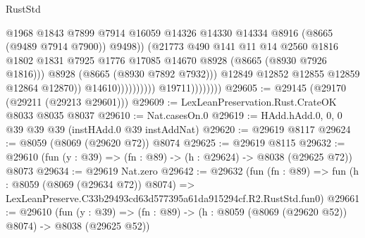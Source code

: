 \begin{lexlean}{RustStd}
\begin{coremodule}
                                                  @1968
                                                  @1843
                                                  @7899
                                                  @7914
                                                  @16059
                                                  @14326
                                                  @14330
                                                  @14334
                                                  @8916
                                                  (@8665 (@9489 @7914 @7900))
                                                  @9498))
                                              (@21773
                                                @490
                                                @141
                                                @11
                                                @14
                                                @2560
                                                @1816
                                                @1802
                                                @1831
                                                @7925
                                                @1776
                                                @17085
                                                @14670
                                                @8928
                                                (@8665 (@8930 @7926 @1816)))
                                              @8928
                                              (@8665 (@8930 @7892 @7932)))
                                            @12849
                                            @12852
                                            @12855
                                            @12859
                                            @12864
                                            @12870))
                                        @14610))))))))))
                    @19711))))))))
@29605 := @29145 (@29170 (@29211 (@29213 @29601)))
@29609 := LexLeanPreservation.Rust.CrateOK @8033 @8035 @8037
@29610 := Nat.casesOn.{0}
@29619 := HAdd.hAdd.{0, 0, 0} @39 @39 @39 (instHAdd.{0} @39 instAddNat)
@29620 := @29619 @8117
@29624 := @8059 (@8069 (@29620 @72)) @8074
@29625 := @29619 @8115
@29632 := @29610 (fun (y : @39) => (fn : @89) -> (h : @29624) -> @8038 (@29625 @72)) @8073
@29634 := @29619 Nat.zero
@29642 := @29632
    (fun (fn : @89) =>
    fun (h : @8059 (@8069 (@29634 @72)) @8074) =>
    LexLeanPreserve.C33b29493cd63d577395a61da915294cf.R2.RustStd.fun0)
@29661 := @29610
    (fun (y : @39) => (fn : @89) -> (h : @8059 (@8069 (@29620 @52)) @8074) -> @8038 (@29625 @52))

\end{coremodule}
\end{lexlean}
